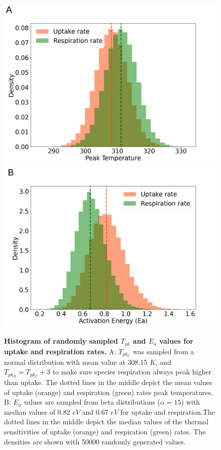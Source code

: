 \begin{figure}[H]
    \centering
    \includegraphics[scale=0.27]{./Figures/SI_UR.png}
    \includegraphics[scale=0.27]{./Figures/SI_UR_1.png}
    \caption{\textbf{Histogram of randomly sampled $T_{pk}$ and $E_a$ values for uptake and respiration rates.} A: $T_{pk_U}$ was sampled from a normal distribution with mean value at 308.15 $K$, and $T_{pk_R} = T_{pk_U} + 3$ to make sure species respiration always peak higher than uptake. The dotted lines in the middle depict the mean values of uptake (orange) and respiration (green) rates peak temperatures. B: $E_a$ values are sampled from beta distributions ($\alpha = 15$) with median values of 0.82 $eV$ and 0.67 $eV$ for uptake and respiration.The dotted lines in the middle depict the median values of the thermal sensitivities of uptake (orange) and respiration (green) rates. The densities are shown with 50000 randomly generated values. }
    \label{fig:SI_UR}
\end{figure}

